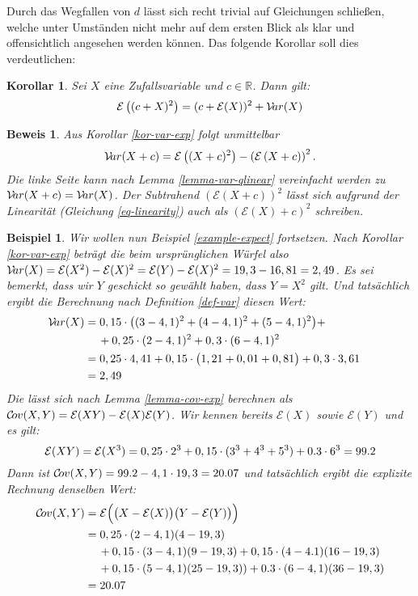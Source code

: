 \documentclass[a4paper]{article}
\newtheorem{korollar}[satz]{Korollar}
\newtheorem{beispiel}[satz]{Beispiel}
\theoremstyle{nonumberplain}
\newtheorem{beweis}{Beweis}
\begin{document}
Durch das Wegfallen von $d$ lässt sich recht trivial auf Gleichungen schließen, welche unter Umständen nicht mehr auf dem ersten Blick als klar und offensichtlich angesehen werden können. Das folgende Korollar soll dies verdeutlichen:
\begin{korollar}
	Sei $X$ eine Zufallsvariable und $c \in \mathbb{R}$. Dann gilt:
	\begin{equation}
		\mathcal{E}\left((c+X)^2\right) = (c+ \mathcal{E}(X))^2 + \mathcal{V}\!ar(X)
	\end{equation}
\end{korollar}
\begin{beweis}
Aus Korollar \ref{kor-var-exp} folgt unmittelbar \[\mathcal{V}\!ar(X+c) = \mathcal{E}\left((X+c)^{2}\right) - \left(\mathcal{E}\left(X+c\right)\right)^{2}\text{.}\] Die linke Seite kann nach Lemma \ref{lemma-var-qlinear} vereinfacht werden zu $\mathcal{V}\!ar(X+c) = \mathcal{V}\!ar(X)$. Der Subtrahend $\left(\mathcal{E}\left(X+c\right)\right)^{2}$ lässt sich aufgrund der Linearität (Gleichung \ref{eq-linearity}) auch als $\left( \mathcal{E}(X)+c\right)^{2}$ 
schreiben.
\end{beweis}

\begin{beispiel}
	Wir wollen nun Beispiel \ref{example-expect} fortsetzen. 
	Nach Korollar \ref{kor-var-exp} beträgt die \var{} beim ursprünglichen Würfel also $\mathcal{V}\!ar(X) = \mathcal{E}(X^2) - \mathcal{E}(X)^2 = \mathcal{E}(Y) - \mathcal{E}(X)^2 = 19,3 - 16,81 = 2,49$. Es sei bemerkt, dass wir $Y$ geschickt so gewählt haben, dass $Y = X^2$ gilt. Und tatsächlich ergibt die Berechnung nach Definition \ref{def-var} diesen Wert:
	\begin{align*}
	\mathcal{V}\!ar(X) & = 0,15 \cdot \big((3- 4,1)^2 + (4-4,1)^2 + (5-4,1)^2\big) + && \\
	& \hspace{1.2em} + 0,25 \cdot (2 - 4,1)^2 + 0,3 \cdot (6-4,1)^2 && \\
	& = 0,25 \cdot 4,41 + 0,15 \cdot \big(1,21 + 0,01 + 0,81\big) + 0,3 \cdot 3,61 && \\
	& = 2,49 &&
	\end{align*}
	Die \cov{} lässt sich nach Lemma \ref{lemma-cov-exp} berechnen als $\mathcal{C}\!ov(X,Y) = \mathcal{E}(XY) - \mathcal{E}(X)\mathcal{E}(Y)$.
	Wir kennen bereits $\mathcal{E}(X)$ sowie $\mathcal{E}(Y)$ und es gilt:
	\[
		\mathcal{E}(XY) = \mathcal{E}(X^3) = 0,25 \cdot 2^3 + 0,15 \cdot (3^3 + 4^3 + 5^3) + 0.3 \cdot 6^3 = 99.2
	\]
	Dann ist  $\mathcal{C}\!ov(X,Y) = 99.2 - 4,1 \cdot 19,3 = 20.07$ und tatsächlich ergibt die explizite Rechnung denselben Wert:
	\begin{align*}
		\mathcal{C}\!ov(X,Y) &= \mathcal{E} \Big( \big(X - \mathcal{E}(X)\big)\big(Y - \mathcal{E}(Y) \big)\Big) \\
		&= 0,25 \cdot (2-4,1)(4-19,3) \\
		& \hspace{1.2em} + 0,15 \cdot (3-4,1)(9-19,3) + 0,15 \cdot (4-4.1)(16-19,3) \\
		& \hspace{1.2em} +  0,15 \cdot (5-4,1)(25-19,3)) + 0.3 \cdot (6-4,1)(36-19,3) \\
		&= 20.07
	\end{align*}
\end{beispiel}
\end{document}
